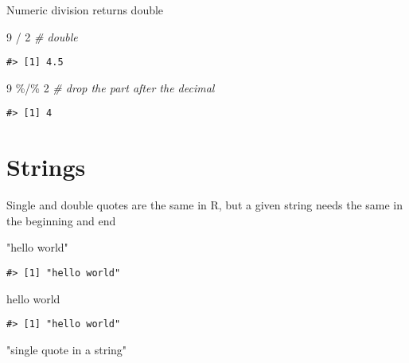 \documentclass[
]{book}
\newenvironment{Shaded}{\begin{snugshade}}{\end{snugshade}}
\newcommand{\CommentTok}[1]{\textcolor[rgb]{0.56,0.35,0.01}{\textit{#1}}}
\newcommand{\DecValTok}[1]{\textcolor[rgb]{0.00,0.00,0.81}{#1}}
\newcommand{\SpecialCharTok}[1]{\textcolor[rgb]{0.00,0.00,0.00}{#1}}
\newcommand{\StringTok}[1]{\textcolor[rgb]{0.31,0.60,0.02}{#1}}
\begin{document}
Numeric division returns double

\begin{Shaded}
\begin{Highlighting}[]
\DecValTok{9} \SpecialCharTok{/} \DecValTok{2} \CommentTok{\# double}
\end{Highlighting}
\end{Shaded}

\begin{verbatim}
#> [1] 4.5
\end{verbatim}

\begin{Shaded}
\begin{Highlighting}[]
\DecValTok{9} \SpecialCharTok{\%/\%} \DecValTok{2} \CommentTok{\# drop the part after the decimal}
\end{Highlighting}
\end{Shaded}

\begin{verbatim}
#> [1] 4
\end{verbatim}

\hypertarget{strings-1}{%
\section{Strings}\label{strings-1}}

Single and double quotes are the same in R, but a given string needs the same in the beginning and end

\begin{Shaded}
\begin{Highlighting}[]
\StringTok{"hello world"}
\end{Highlighting}
\end{Shaded}

\begin{verbatim}
#> [1] "hello world"
\end{verbatim}

\begin{Shaded}
\begin{Highlighting}[]
\StringTok{\textquotesingle{}hello world\textquotesingle{}}
\end{Highlighting}
\end{Shaded}

\begin{verbatim}
#> [1] "hello world"
\end{verbatim}

\begin{Shaded}
\begin{Highlighting}[]
\StringTok{"single quote \textquotesingle{} in a string"}
\end{Highlighting}
\end{Shaded}
\end{document}
